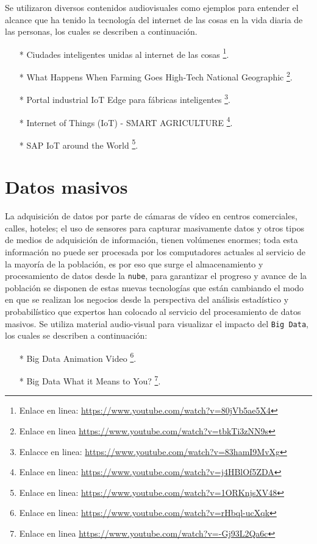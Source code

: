 \documentclass[jou]{apa6} %
\begin{document}
Se utilizaron diversos contenidos audiovisuales como ejemplos para entender el alcance que ha tenido la tecnología del internet de las cosas en la vida diaria de las personas, los cuales se describen a continuación.
\begin{enumerate}
\item[*] Ciudades inteligentes unidas al internet de las cosas \footnote{Enlace en linea: \url{https://www.youtube.com/watch?v=80jVb5ae5X4}}.
\item[*] What Happens When Farming Goes High-Tech National Geographic \footnote{Enlace en linea \url {https://www.youtube.com/watch?v=tbkTi3zNN9s}}.
\item[*] Portal industrial IoT Edge para fábricas inteligentes \footnote{Enlacce en linea: \url{https://www.youtube.com/watch?v=83hamI9MvXg}}.
\item[*] Internet of Things (IoT) - SMART AGRICULTURE \footnote{Enlace en linea: \url{https://www.youtube.com/watch?v=j4HBlOf5ZDA}}.
\item[*] SAP IoT around the World \footnote{Enlace en linea: \url{https://www.youtube.com/watch?v=1ORKnjsXV48}}.
\end{enumerate}

\section{Datos masivos}
La adquisición de datos por parte de cámaras de vídeo en centros comerciales, calles, hoteles; el uso de sensores para capturar masivamente datos y otros tipos de medios de adquisición de información, tienen volúmenes enormes; toda esta información no puede ser procesada por los computadores actuales al servicio de la mayoría de la población, es por eso que surge el almacenamiento y procesamiento de datos desde la \texttt{nube}, para garantizar el progreso y avance de la población se disponen de estas nuevas tecnologías que están \cite{malvicino2014big} cambiando el modo en que se realizan los negocios desde la perspectiva del análisis estadístico y probabilístico que expertos han colocado al servicio del procesamiento de datos masivos. Se utiliza material audio-visual para visualizar el impacto del \texttt{Big Data}, los cuales se describen a continuación:

\begin{enumerate}
\item[*] Big Data Animation Video \footnote{Enlace en linea: \url{https://www.youtube.com/watch?v=rHbql-ucXqk}}.
\item[*] Big Data What it Means to You? \footnote{Enlace en linea \url{https://www.youtube.com/watch?v=-Gj93L2Qa6c}}.
\end{enumerate}
\end{document}
